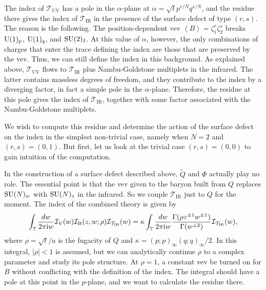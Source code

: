 The index of $\mathcal{T}_{\mathrm{UV}}$ has a pole in the $\alpha$-plane
at $\alpha=\sqrt{t}p^{r/N}q^{s/N}$, and the residue there gives the
index of $\mathcal{T}_{\mathrm{IR}}$ in the presence of the surface
defect of type $(r,s)$. The reason is the following. The position-dependent
vev $\left\langle B\right\rangle =\zeta_{1}^{r}\zeta_{2}^{s}$ breaks
$\mathrm{U}(1)_{p}$, $\mathrm{U}(1)_{q}$, and $\mathrm{SU}(2)_{I}$. At this value of $\alpha$,
however, the only combinations of charges that enter the trace defining
the index are those that are preserved by the vev. Thus, we can still
define the index in this background. As explained above, $\mathcal{T}_{\mathrm{UV}}$
flows to $\mathcal{T}_{\mathrm{IR}}$ plus Nambu-Goldstone multiplets
in the infrared. The latter contains massless degrees of freedom,
and they contribute to the index by a diverging factor, in fact a
simple pole in the $\alpha$-plane. Therefore, the residue at this
pole gives the index of $\mathcal{T}_{\mathrm{IR}}$, together with
some factor associated with the Nambu-Goldstone multiplets.

We wish to compute this residue and determine the action of the surface
defect on the index in the simplest non-trivial case, namely when
$N=2$ and $(r,s)=(0,1)$. But first, let us look at the trivial case
$(r,s)=(0,0)$ to gain intuition of the computation.

In the construction of a surface defect described above, $\tilde{Q}$
and $\Phi$ actually play no role. The essential point is that the
vev given to the baryon built from $Q$ replaces $\mathrm{SU}(N)_{w}$ with
$\mathrm{SU}(N)_{z}$ in the infrared. So we couple $\mathcal{T}_{\mathrm{IR}}$
just to $Q$ for the moment. The index of the combined theory is given
by
\begin{equation}
    \int_{\mathbb{T}}\frac{dw}{2\pi \mathrm{i} w}
    \mathcal{I}_{\mathrm{V}}(w)
    \mathcal{I}_{\mathrm{B}}(z,w;\rho)
    \mathcal{I}_{\mathcal{T}_{\mathrm{IR}}}(w)
      =
        \kappa  \int_{\mathbb{T}}\frac{dw}{2\pi \mathrm{i} w}
        \frac{\Gamma(\rho z^{\pm1}w^{\pm1})}{\Gamma(w^{\pm2})}
        \mathcal{I}_{\mathcal{T}_{\mathrm{IR}}}(w),
\end{equation}
where $\rho=\sqrt{t}/a$ is the fugacity of $Q$ and $\kappa=(p;p)_{\infty}(q;q)_{\infty}/2$.
In this integral, $|\rho|<1$ is assumed, but we can analytically
continue $\rho$ to a complex parameter and study its pole structure.
At $\rho=1$, a constant vev be turned on for $B$ without conflicting
with the definition of the index. The integral should have a pole
at this point in the $p$-plane, and we want to calculate the residue
there.


